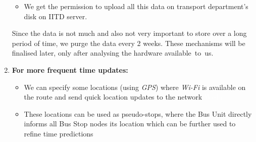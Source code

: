 \begin{enumerate}
\begin{itemize}
    \item We get the permission to upload all this data on transport department’s disk on IITD server.
\end{itemize}

Since the data is not much and also not very important to store over a long period of time, we purge the data every 2 weeks.
These mechanisms will be finalised later, only after analysing the hardware available to us.

          
    \item \textbf{For more frequent time updates:}
          \begin{itemize}
              \item We can specify some locations (using \textit{\gls{GPS}}) where \textit{\gls{Wi-Fi}} is available on the route and send quick location updates to the network {\tiny \textcolor{white}{\ac{Wi-Fi}}}
              \item These locations can be used as pseudo-stops, where the Bus Unit directly informs all Bus Stop nodes its location which can be further used to refine time predictions
          \end{itemize}
\end{enumerate}